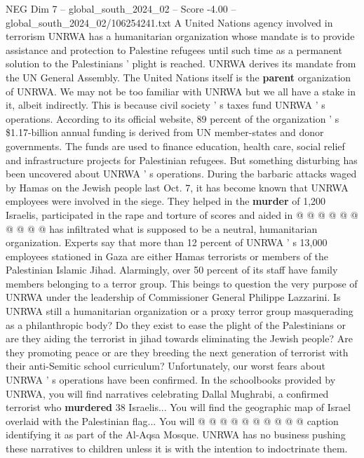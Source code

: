 \begin{textsample}{NEG Dim 7 – global\_south\_2024\_02 – Score -4.00 – global\_south\_2024\_02/106254241.txt}  \label{ex:f7_neg_397}
A United Nations agency involved in terrorism UNRWA has a humanitarian organization whose mandate is to provide assistance and protection to Palestine refugees until such time as a permanent solution to the Palestinians ' plight is reached.
UNRWA derives its mandate from the UN General Assembly.
The United Nations itself is the \textbf{parent} organization of UNRWA.
We may not be too familiar with UNRWA but we all have a stake in it, albeit indirectly.
This is because civil society ' s taxes fund UNRWA ' s operations.
According to its official website, 89 percent of the organization ' s \$1.17-billion annual funding is derived from UN member-states and donor governments.
The funds are used to finance education, health care, social relief and infrastructure projects for Palestinian refugees.
But something disturbing has been uncovered about UNRWA ' s operations.
During the barbaric attacks waged by Hamas on the Jewish people last Oct. 7, it has become known that UNRWA employees were involved in the siege.
They helped in the \textbf{murder} of 1,200 Israelis, participated in the rape and torture of scores and aided in @ @ @ @ @ @ @ @ @ @ has infiltrated what is supposed to be a neutral, humanitarian organization.
Experts say that more than 12 percent of UNRWA ' s 13,000 employees stationed in Gaza are either Hamas terrorists or members of the Palestinian Islamic Jihad.
Alarmingly, over 50 percent of its staff have family members belonging to a terror group.
This beings to question the very purpose of UNRWA under the leadership of Commissioner General Philippe Lazzarini.
Is UNRWA still a humanitarian organization or a proxy terror group masquerading as a philanthropic body?
Do they exist to ease the plight of the Palestinians or are they aiding the terrorist in jihad towards eliminating the Jewish people?
Are they promoting peace or are they breeding the next generation of terrorist with their anti-Semitic school curriculum?
Unfortunately, our worst fears about UNRWA ' s operations have been confirmed.
In the schoolbooks provided by UNRWA, you will find narratives celebrating Dallal Mughrabi, a confirmed terrorist who \textbf{murdered} 38 Israelis...
You will find the geographic map of Israel overlaid with the Palestinian flag...
You will @ @ @ @ @ @ @ @ @ @ caption identifying it as part of the Al-Aqsa Mosque.
UNRWA has no business pushing these narratives to children unless it is with the intention to indoctrinate them.

\end{textsample}
